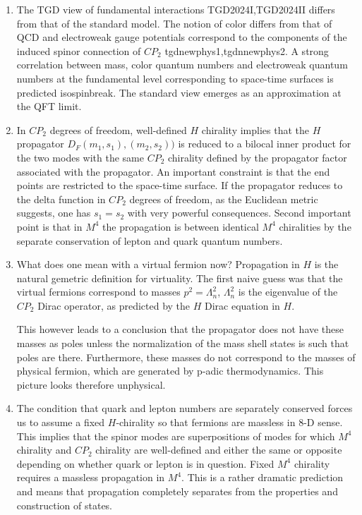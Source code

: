 \documentclass[10pt,epsf]{article}
\begin{document}
\begin{enumerate}

\item The TGD view of  fundamental interactions  \cite{btart}{TGD2024I,TGD2024II} differs from that of the standard model.  The notion of color differs from that of QCD and electroweak gauge potentials correspond to the components of the induced spinor connection of $CP_2$ \cite{allb}{tgdnewphys1,tgdnnewphys2}.  A strong  correlation between mass, color quantum numbers and electroweak quantum numbers at  the fundamental level corresponding to space-time surfaces is predicted \cite{btart}{isospinbreak}. The standard view emerges as an approximation at the QFT limit.

\item In $CP_2$ degrees of freedom, well-defined $H$ chirality implies that the  $H$ propagator $D_F(m_1,s_1),(m_2,s_2))$   is reduced to  a bilocal inner product for the two modes with the same  $CP_2$ chirality defined by the propagator factor associated with the propagator. An important constraint is that the end  points are restricted to the space-time surface. If the propagator reduces to the delta function in $CP_2$ degrees of freedom, as the Euclidean metric suggests, one has $s_1=s_2$ with very powerful consequences. Second important point is that in $M^4$  the propagation is between identical $M^4$ chiralities by the separate conservation of lepton and quark quantum numbers.

\item What  does one mean  with a virtual fermion now?  Propagation in $H$ is the natural  gemetric definition for virtuality. The first naive guess was that the virtual fermions  correspond to masses $p^2=\Lambda_n^2$, $\Lambda_n^2$ is the eigenvalue of the $CP_2$ Dirac operator,   as predicted by the $H$ Dirac equation in $H$.  

This however leads to a conclusion that the propagator does not have these masses as poles unless the normalization of the mass shell states is such that poles are there. Furthermore, these masses do not correspond to the masses of physical fermion, which are generated by p-adic thermodynamics. This picture looks therefore unphysical.

\item The condition  that quark and lepton numbers are separately conserved forces us to assume a fixed $H$-chirality so that fermions are massless in 8-D sense. This implies that the spinor modes are superpositions of modes for which $M^4$ chirality and $CP_2$ chirality are well-defined and either the same or opposite depending on whether quark or lepton is in question. Fixed $M^4$ chirality requires a massless propagation in $M^4$. This  is a rather dramatic prediction and means that propagation completely separates from the properties and construction of states.


\end{enumerate}
\end{document}
